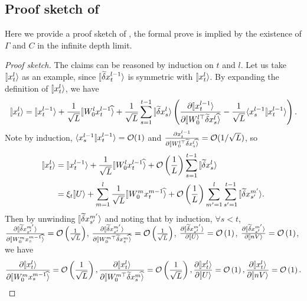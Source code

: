 \documentclass{article}
\theoremstyle{plain}
\theoremstyle{definition}
\begin{document}
\subsection{Proof sketch of }
Here we provide a proof sketch of , the formal prove is implied by the existence of $\Gamma$ and $C$ in the infinite depth limit.
\begin{proof}[Proof sketch]
The claims can be reasoned by induction on $t$ and $l$. Let us take $\ket{x_t^l}$ as an example, since $\ket{\tilde \del x_t^{l-1}}$ is symmetric with $\ket{x_t^l}$. 
By expanding the definition of $\ket{x_t^l}$, we have 
\[\ket{x_t^l} = \ket{x_t^{l-1}} + \frac1{\sqrt L} \hatket{W_0^l x_t^{l-1}} + \frac1{\sqrt L} \sum_{s=1}^{t-1} \ket{\tilde \del x_s^{l}} \left(\frac{\partial \ket{x_t^{l-1}}}{\partial \hatket{W_0^{l\top} \tilde \del x_s^{l}}} - \frac1{\sqrt L} \braket{x_s^{l-1}}{x_t^{l-1}} \right).\]
Note by induction, $\braket{x_s^{l-1}}{x_t^{l-1}}=\cO(1)$ and $\frac{\partial x_t^{l-1}}{\partial \hatket{W_0^{l\top} \tilde \del x_s^{l}}}=\cO(1/\sqrt L)$,
so
\begin{align*}
    \ket{x_t^l} & = \ket{x_t^{l-1}} + \frac1{\sqrt L} \hatket{W_0^l x_t^{l-1}} + \cO\left(\frac1L\right)\sum_{s=1}^{t-1} \ket{\tilde \del x_s^{l}} \\
    & = \xi_t \ket{U} + \sum_{m=1}^l \frac1{\sqrt L} \hatket{W_0^m x_t^{m-1}}+\cO\left(\frac1L\right)\sum_{m'=1}^l\sum_{s'=1}^{t-1}\ket{\tilde \del x_{s'}^{m'}}.
\end{align*}
Then by unwinding $\ket{\tilde \del x_{s'}^{m'}}$ and noting that by induction, $\forall s <t$, $
    \frac{\partial \ket{\tilde \del x_{s'}^{m'}}}{\partial \hatket{W_0^mx_s^{m-1}}} = \cO\left(\frac1{\sqrt L}\right)$,
    $\frac{\partial \ket{\tilde \del x_{s'}^{m'}}}{\partial \hatket{W_0^{m\top}\tilde \del x_s^m}} = \cO\left(\frac1{\sqrt L}\right)$,
    $\frac{\partial \ket{\tilde \del x_{s'}^{m'}}}{\partial \ket{U}} = \cO\left(1\right)$,
    $\frac{\partial \ket{\tilde \del x_{s'}^{m'}}}{\partial \ket{nV}} = \cO\left(1\right)$,
we have 
\[\frac{\partial \ket{x_t^l}}{\partial \hatket{W_0^mx_s^{m-1}}} = \cO\left(\frac1{\sqrt L}\right),
     \frac{\partial \ket{x_t^l}}{\partial \hatket{W_0^{m\top}\tilde \del x_s^m}} = \cO\left(\frac1{\sqrt L}\right),
     \frac{\partial \ket{x_t^l}}{\partial \ket{U}} = \cO\left(1\right),
     \frac{\partial \ket{x_t^l}}{\partial \ket{nV}} = \cO\left(1\right).\]


\end{proof}
\end{document}
